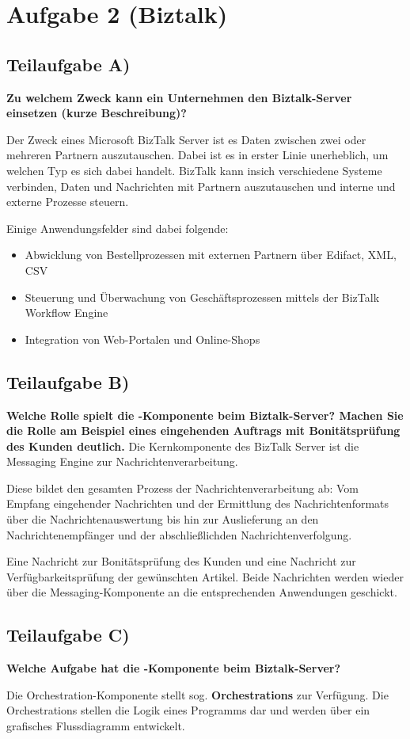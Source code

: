 \section{Aufgabe 2 (Biztalk)}

\subsection{Teilaufgabe A)}
\textbf{Zu welchem Zweck kann ein Unternehmen den Biztalk-Server einsetzen (kurze
Beschreibung)?}

Der Zweck eines Microsoft BizTalk Server ist es Daten zwischen zwei oder
mehreren Partnern auszutauschen. Dabei ist es in erster Linie unerheblich, um
welchen Typ es sich dabei handelt. BizTalk kann insich verschiedene Systeme
verbinden, Daten und Nachrichten mit Partnern auszutauschen und interne und
externe Prozesse steuern.

Einige Anwendungsfelder sind dabei folgende:
\begin{itemize}
  \item Abwicklung von Bestellprozessen mit externen Partnern über Edifact, XML,
  CSV
  \item Steuerung und Überwachung von Geschäftsprozessen mittels der BizTalk
  Workflow Engine
  \item Integration von Web-Portalen und Online-Shops
\end{itemize}

\subsection{Teilaufgabe B)}
\textbf{Welche Rolle spielt die -Komponente beim Biztalk-Server?
Machen Sie die Rolle am Beispiel eines eingehenden Auftrags mit Bonitätsprüfung des Kunden
deutlich.}
Die Kernkomponente des BizTalk Server ist die Messaging Engine zur
Nachrichtenverarbeitung. 

Diese bildet den gesamten Prozess der Nachrichtenverarbeitung ab: Vom Empfang
eingehender Nachrichten und der Ermittlung des Nachrichtenformats über die
Nachrichtenauswertung bis hin zur Auslieferung an den Nachrichtenempfänger und
der abschließlichden Nachrichtenverfolgung.

Eine Nachricht zur Bonitätsprüfung des Kunden und eine Nachricht zur
Verfügbarkeitsprüfung der gewünschten Artikel. Beide Nachrichten werden wieder
über die Messaging-Komponente an die entsprechenden Anwendungen geschickt.

\clearpage
\subsection{Teilaufgabe C)}
\textbf{Welche Aufgabe hat die -Komponente beim
Biztalk-Server?}

Die Orchestration-Komponente stellt sog. \textbf{Orchestrations} zur Verfügung.
Die Orchestrations stellen die Logik eines Programms dar und werden über ein
grafisches Flussdiagramm entwickelt.


\clearpage 
